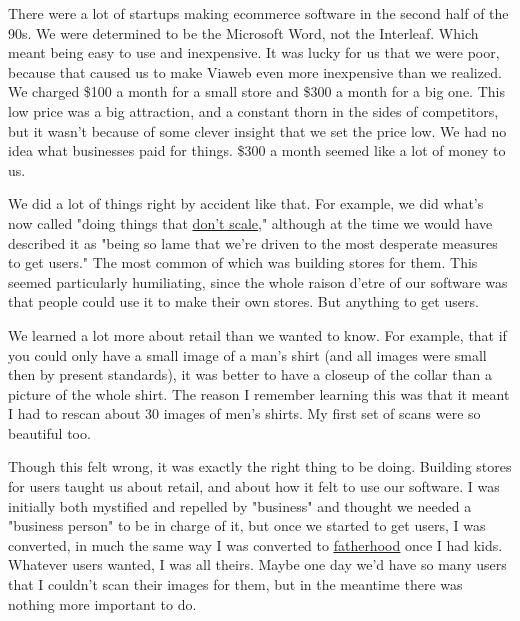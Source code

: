 There were
                  a lot of startups making ecommerce software in the second half
                  of the 90s. We were determined to be the Microsoft Word, not
                  the Interleaf. Which meant being easy to use and inexpensive.
                  It was lucky for us that we were poor, because that caused us
                  to make Viaweb even more inexpensive than we realized. We
                  charged \$100 a month for a small store and \$300 a month for a
                  big one. This low price was a big attraction, and a constant
                  thorn in the sides of competitors, but it wasn't because of
                  some clever insight that we set the price low. We had no idea
                  what businesses paid for things. \$300 a month seemed like a
                  lot of money to us.

We did a lot of things right by
                  accident like that. For example, we did what's now called
                  "doing things that \href{http://www.paulgraham.com/ds.html}{\underline{don't scale}}," although at the time we would have described it as "being
                  so lame that we're driven to the most desperate measures to
                  get users." The most common of which was building stores for
                  them. This seemed particularly humiliating, since the whole
                  raison d'etre of our software was that people could use it to
                  make their own stores. But anything to get users.

We
                  learned a lot more about retail than we wanted to know. For
                  example, that if you could only have a small image of a man's
                  shirt (and all images were small then by present standards),
                  it was better to have a closeup of the collar than a picture
                  of the whole shirt. The reason I remember learning this was
                  that it meant I had to rescan about 30 images of men's shirts.
                  My first set of scans were so beautiful too.

Though
                  this felt wrong, it was exactly the right thing to be doing.
                  Building stores for users taught us about retail, and about
                  how it felt to use our software. I was initially both
                  mystified and repelled by "business" and thought we needed a
                  "business person" to be in charge of it, but once we started
                  to get users, I was converted, in much the same way I was
                  converted to \href{http://www.paulgraham.com/kids.html}{\underline{fatherhood}} once I
                  had kids. Whatever users wanted, I was all theirs. Maybe one
                  day we'd have so many users that I couldn't scan their images
                  for them, but in the meantime there was nothing more important
                  to do.

